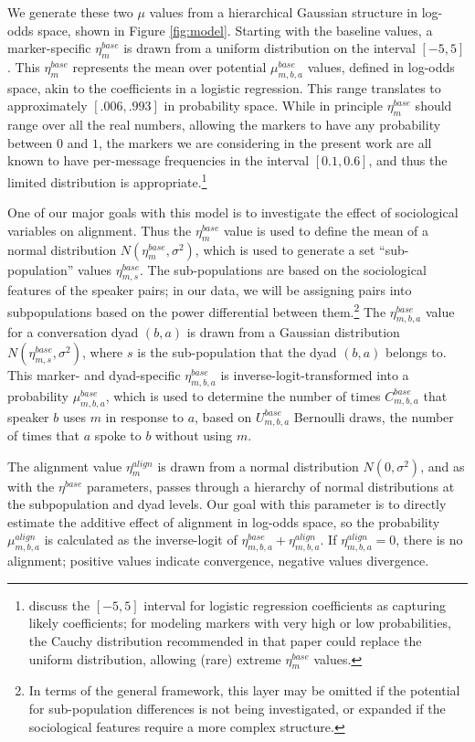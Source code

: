 \documentclass{acm_proc_article-sp}
\begin{document}
We generate these two $\mu$ values from a hierarchical Gaussian structure in log-odds space, shown in Figure \ref{fig:model}.  Starting with the baseline values, a marker-specific $\eta^{base}_m$ is drawn from a uniform distribution on the interval $[-5,5]$. This $\eta^{base}_m$ represents the mean over potential $\mu^{base}_{m,b,a}$ values, defined in log-odds space, akin to the coefficients in a logistic regression. This range translates to approximately $[.006,.993]$ in probability space.  While in principle $\eta^{base}_m$ should range over all the real numbers, allowing the markers to have any probability between $0$ and $1$, the markers we are considering in the present work are all known to have per-message frequencies in the interval $[0.1,0.6]$, and thus the limited distribution is appropriate.\footnote{\cite{GelmanEtAl2008} discuss the $[-5,5]$ interval for logistic regression coefficients as capturing likely coefficients; for modeling markers with very high or low probabilities, the Cauchy distribution recommended in that paper could replace the uniform distribution, allowing (rare) extreme $\eta^{base}_m$ values.}  

One of our major goals with this model is to investigate the effect of sociological variables on alignment. Thus the $\eta^{base}_m$ value is used to define the mean of a normal distribution $N(\eta^{base}_m,\sigma^2)$, which is used to generate a set ``sub-population'' values $\eta^{base}_{m,s}$.  The sub-populations are based on the sociological features of the speaker pairs; in our data, we will be assigning pairs into subpopulations based on the power differential between them.\footnote{In terms of the general framework, this layer may be omitted if the potential for sub-population differences is not being investigated, or expanded if the sociological features require a more complex structure.} The $\eta^{base}_{m,b,a}$ value for a conversation dyad $(b,a)$ is drawn from a Gaussian distribution $N(\eta^{base}_{m,s},\sigma^2)$, where $s$ is the sub-population that the dyad $(b,a)$ belongs to. This marker- and dyad-specific $\eta^{base}_{m,b,a}$ is inverse-logit-transformed into a probability $\mu^{base}_{m,b,a}$, which is used to determine the number of times $C^{base}_{m,b,a}$ that speaker $b$ uses $m$ in response to $a$, based on $U^{base}_{m,b,a}$ Bernoulli draws, the number of times that $a$ spoke to $b$ without using $m$.

The alignment value $\eta^{align}_m$ is drawn from a normal distribution $N(0,\sigma^2)$, and as with the $\eta^{base}$ parameters, passes through a hierarchy of normal distributions at the subpopulation and dyad levels. Our goal with this parameter is to directly estimate the additive effect of alignment in log-odds space, so the probability $\mu^{align}_{m,b,a}$ is calculated as the inverse-logit of $\eta^{base}_{m,b,a}+\eta^{align}_{m,b,a}$.  If $\eta^{align}_{m,b,a} = 0$, there is no alignment; positive values indicate convergence, negative values divergence.
\end{document}
